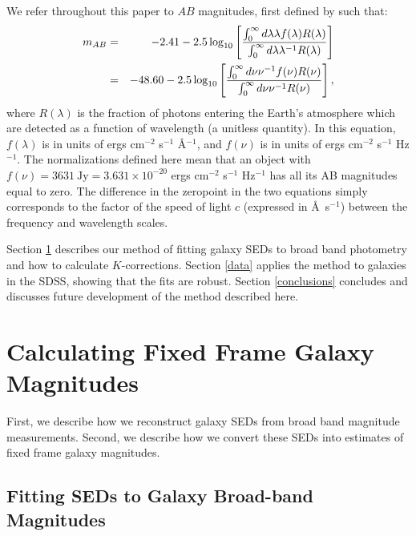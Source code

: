 \documentclass[10pt,preprint]{aastex}
\begin{document}
We refer throughout this paper to $AB$ magnitudes, first defined 
by \citet{oke83a} such that:
\begin{eqnarray}
\label{ABdef}
m_{AB} &=& -2.41 - 2.5 \log_{10}\left[
\frac{\int_{0}^{\infty} d\lambda \lambda f(\lambda) R(\lambda)}
{\int_{0}^{\infty} d\lambda \lambda^{-1} R(\lambda)}\right]
\cr
&=& -48.60 - 2.5 \log_{10}\left[
\frac{\int_{0}^{\infty} d\nu \nu^{-1} f(\nu) R(\nu)}
{\int_{0}^{\infty} d\nu \nu^{-1} R(\nu)}\right],
\end{eqnarray}
where $R(\lambda)$ is the fraction of photons entering the Earth's
atmosphere which are detected as a function of wavelength (a unitless
quantity). In this equation, $f(\lambda)$ is in units of ergs
cm$^{-2}$ s$^{-1}$ \AA$^{-1}$, and $f(\nu)$ is in units of ergs
cm$^{-2}$ s$^{-1}$ Hz$^{-1}$. The normalizations defined here mean
that an object with $f(\nu) = 3631\mathrm{~Jy} = 3.631 \times
10^{-20}$ ergs cm$^{-2}$ s$^{-1}$ Hz$^{-1}$ has all its AB magnitudes
equal to zero.  The difference in the zeropoint in the two equations
simply corresponds to the factor of the speed of light $c$ (expressed
in \AA\ s$^{-1}$) between the frequency and wavelength scales. 

Section \ref{sedfit} describes our method of fitting galaxy SEDs to
broad band photometry and how to calculate $K$-corrections. Section
\ref{data} applies the method to galaxies in the SDSS, showing that
the fits are robust.  Section \ref{conclusions} concludes and
discusses future development of the method described here.

\section{Calculating Fixed Frame Galaxy Magnitudes}
\label{sedfit}

First, we describe how we reconstruct galaxy SEDs from broad band
magnitude measurements. Second, we describe how we convert these SEDs
into estimates of fixed frame galaxy magnitudes. 

\subsection{Fitting SEDs to Galaxy Broad-band Magnitudes}
\end{document}
